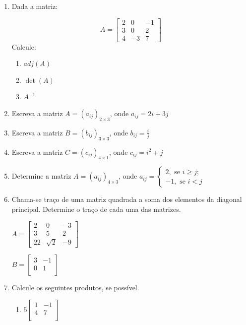 \documentclass[oneside,a4paper,12pt]{article}
\begin{document}
\begin{enumerate}
	\item Dada a matriz:
	
	$$A=\left[
	\begin{array}{ccc}
		2	&	0	&	-1	\\
		3	&	0	&	2	\\
		4	&	-3	&	7
	\end{array}
	\right]
	$$
	Calcule:
	\begin{enumerate}
		\item $adj(A)$
		\item $\det(A)$
		\item $A^{-1}$
	\end{enumerate}
	
	\item Escreva a matriz $A=(a_{ij})_{2 \times 3}$, onde $a_{ij} = 2i + 3j$
	
	\item Escreva a matriz $B=(b_{ij})_{3 \times 3}$, onde $b_{ij} = \frac{i}{j}$
	
	\item Escreva a matriz $C=(c_{ij})_{4 \times 1}$, onde $c_{ij} = i^2 + j$
	
	\item Determine a matriz $A=(a_{ij})_{4 \times 3}$, onde $a_{ij} = \begin{cases}
	2, \text{ se } i \geq j;\\ -1, \text{ se } i<j
	\end{cases}$
	
	\item Chama-se traço de uma matriz quadrada a soma dos elementos da diagonal principal. Determine o traço de cada uma das matrizes.
	\begin{multicols}{2}
	$A=\left[
	\begin{array}{ccc}
	2	&	0	&	-3	\\
	3	&	5	&	2	\\
	22	&	\sqrt{2}	&	-9
	\end{array}
	\right]
	$
	
	$
	B=\left[
	\begin{array}{cc}
	3	&	-1	\\
	0	&	1	\\
	\end{array}
	\right]$
	\end{multicols}
	
	\item Calcule os seguintes produtos, se possível.
	\begin{multicols}{2}
	\begin{enumerate}
		\item 	$
		5 \left[
		\begin{array}{cc}
		1	&	-1	\\
		4	&	7	\\
		\end{array}
		\right]$
		

\end{enumerate}
\end{multicols}
\end{enumerate}
\end{document}
